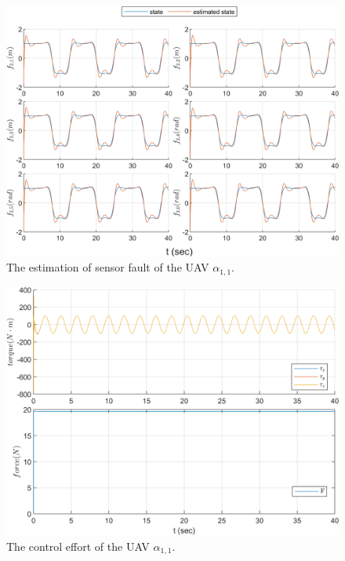 \documentclass{ieeeaccess}
\begin{document}
\begin{figure}[htbp]
    \centering
    \includegraphics[scale=.57]{fig/uav (3).png}\caption{The estimation of sensor fault of the UAV $\alpha_{1,1}$.}%
    \label{fig:UAV, fs}
\end{figure}
\begin{figure}[htbp]
    \centering
    \includegraphics[scale=.57]{fig/uav (4).png}\caption{The control effort of the UAV $\alpha_{1,1}$.}%
    \label{fig:UAV, control}
\end{figure}
\end{document}
